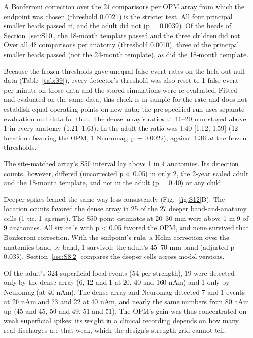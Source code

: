 \documentclass[preprint,12pt,authoryear,a4paper]{elsarticle}
\begin{document}
A Bonferroni correction over the 24 comparisons per OPM array from which the endpoint was chosen (threshold 0.0021) is the stricter test. All four principal smaller heads passed it, and the adult did not (p = 0.0039). Of the heads of Section~\ref{sec:S10}, the 18-month template passed and the three children did not. Over all 48 comparisons per anatomy (threshold 0.0010), three of the principal smaller heads passed (not the 24-month template), as did the 18-month template.

Because the frozen thresholds gave unequal false-event rates on the held-out null data (Table~\ref{tab:S9}), every detector's threshold was also reset to 1 false event per minute on those data and the stored simulations were re-evaluated. Fitted and evaluated on the same data, this check is in-sample for the rate and does not establish equal operating points on new data; the pre-specified run uses separate evaluation null data for that. The dense array's ratios at 10–20 mm stayed above 1 in every anatomy (1.21–1.63). In the adult the ratio was 1.40 [1.12, 1.59] (12 locations favoring the OPM, 1 Neuromag, p = 0.0022), against 1.36 at the frozen thresholds.

The site-matched array's S50 interval lay above 1 in 4 anatomies. Its detection counts, however, differed (uncorrected p < 0.05) in only 2, the 2-year scaled adult and the 18-month template, and not in the adult (p = 0.40) or any child.

Deeper spikes leaned the same way less consistently (Fig.~\ref{fig:S12}B). The location counts favored the dense array in 25 of the 27 deeper band-and-anatomy cells (1 tie, 1 against). The S50 point estimates at 20–30 mm were above 1 in 9 of 9 anatomies. All six cells with p < 0.05 favored the OPM, and none survived that Bonferroni correction. With the endpoint's rule, a Holm correction over the anatomies band by band, 1 survived: the adult's 45–70 mm band (adjusted p 0.035). Section~\ref{sec:S8.2} compares the deeper cells across model versions.

Of the adult's 324 superficial focal events (54 per strength), 19 were detected only by the dense array (6, 12 and 1 at 20, 40 and 160 nAm) and 1 only by Neuromag (at 40 nAm). The dense array and Neuromag detected 7 and 1 events at 20 nAm and 33 and 22 at 40 nAm, and nearly the same numbers from 80 nAm up (45 and 45, 50 and 49, 51 and 51). The OPM's gain was thus concentrated on weak superficial spikes; its weight in a clinical recording depends on how many real discharges are that weak, which the design's strength grid cannot tell.
\end{document}
